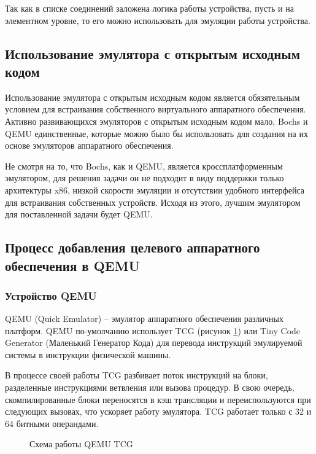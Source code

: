 Так как в списке соединений заложена логика работы устройства, пусть и на элементном уровне,
то его можно использовать для эмуляции работы устройства.


\subsection{Использование эмулятора с открытым исходным кодом}\label{sec:ch1/sec4/sub2}

Использование эмулятора с открытым исходным кодом является обязятельным
условием для встраивания собственного виртуального аппаратного обеспечения.
Активно развивающихся эмуляторов с открытым исходным кодом мало, Bochs и QEMU
единственные, которые можно было бы использовать для создания на их основе
эмуляторов аппаратного обеспечения.

Не смотря на то, что Bochs, как и QEMU, является кроссплатформенным эмулятором,
для решения задачи он не подходит в виду поддержки только архитектуры x86,
низкой скорости эмуляции и отсутствии удобного интерфейса для встраивания
собственных устройств.
Исходя из этого, лучшим эмулятором для поставленной задачи будет QEMU.

\subsection{Процесс добавления целевого аппаратного обеспечения в QEMU}\label{sec:ch1/sec4/sub3}


\subsubsection{Устройство QEMU}\label{sec:ch1/sec4/sub3/sub1}

QEMU (Quick Emulator) -- эмулятор аппаратного обеспечения различных платформ.
QEMU по-умолчанию использует TCG (рисунок \ref{fig:qemu-tcg}) или Tiny Code Generator (Маленький Генератор Кода) для
перевода инструкций эмулируемой системы в инструкции физической машины.

В процессе своей работы TCG разбивает поток инструкций на блоки, разделенные инструкциями
ветвления или вызова процедур.
В свою очередь, скомпилированные блоки переносятся в кэш трансляции и переиспользуются при следующих
вызовах, что ускоряет работу эмулятора.
TCG работает только с 32 и 64 битными операндами.

\begin{figure}[!htbp]
    \centering
    
    \caption{Схема работы QEMU TCG}\label{fig:qemu-tcg}
\end{figure}

